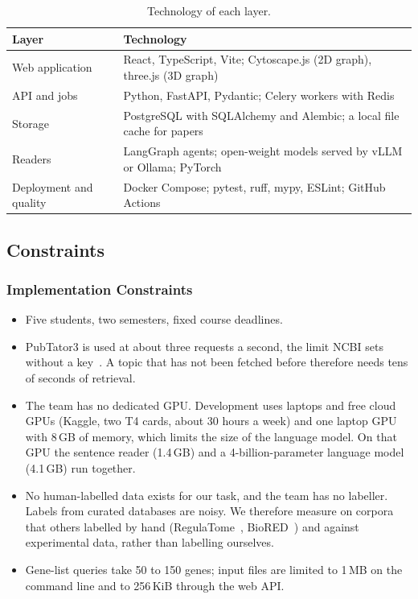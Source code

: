 \documentclass[11pt,a4paper]{article}
\begin{document}
\begin{table}[htbp]
\centering
\small
\begin{tabular}{@{}ll@{}}
\toprule
\textbf{Layer} & \textbf{Technology}\\
\midrule
Web application & React, TypeScript, Vite; Cytoscape.js (2D graph), three.js (3D graph)\\
API and jobs & Python, FastAPI, Pydantic; Celery workers with Redis\\
Storage & PostgreSQL with SQLAlchemy and Alembic; a local file cache for papers\\
Readers & LangGraph agents; open-weight models served by vLLM or Ollama; PyTorch\\
Deployment and quality & Docker Compose; pytest, ruff, mypy, ESLint; GitHub Actions\\
\bottomrule
\end{tabular}
\caption{Technology of each layer.}
\label{tab:tech}
\end{table}

\subsection{Constraints}

\subsubsection{Implementation Constraints}
\begin{itemize}
  \item Five students, two semesters, fixed course deadlines.
  \item PubTator3 is used at about three requests a second, the limit NCBI sets without a
    key~\cite{ncbikey}. A topic that has not been fetched before therefore needs tens of seconds
    of retrieval.
  \item The team has no dedicated GPU. Development uses laptops and free cloud GPUs (Kaggle, two
    T4 cards, about 30 hours a week) and one laptop GPU with 8\,GB of memory, which limits the
    size of the language model. On that GPU the sentence reader (1.4\,GB) and a
    4-billion-parameter language model (4.1\,GB) run together.
  \item No human-labelled data exists for our task, and the team has no labeller. Labels from
    curated databases are noisy. We therefore measure on corpora that others labelled by hand
    (RegulaTome~\cite{regulatome}, BioRED~\cite{biored}) and against experimental data, rather
    than labelling ourselves.
  \item Gene-list queries take 50 to 150 genes; input files are limited to 1\,MB on the
    command line and to 256\,KiB through the web API.
\end{itemize}
\end{document}
